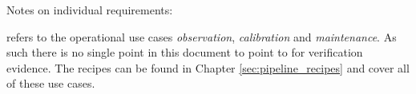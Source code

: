Notes on individual requirements:

\noindent{} refers to the operational use cases
\emph{observation}, \emph{calibration} and \emph{maintenance}. As such there is
no single point in this document to point to for verification evidence. The
recipes can be found in Chapter \ref{sec:pipeline_recipes} and cover all of
these use cases.